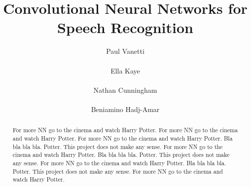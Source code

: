 \documentclass{article} %
\title{Convolutional Neural Networks for Speech Recognition}
\author{
Paul Vanetti \\
\texttt{} \\
\And
Ella Kaye \\
\texttt{} \\
\And
Nathan Cunningham \\
\texttt{} \\
\And
Beniamino Hadj-Amar \\
\texttt{}
}
\begin{document}
\maketitle


\begin{abstract}
For more NN go to the cinema and watch Harry Potter.  For more NN go to the cinema and watch Harry Potter. For more NN go to the cinema and watch Harry Potter. 
Bla bla bla bla. Potter. This project does not make any sense. For more NN go to the cinema and watch Harry Potter. Bla bla bla bla. Potter. This project does not make any sense. For more NN go to the cinema and watch Harry Potter. Bla bla bla bla. Potter. This project does not make any sense. For more NN go to the cinema and watch Harry Potter.
\end{abstract}













\end{document}
